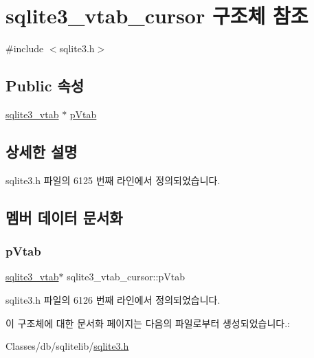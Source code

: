 \hypertarget{structsqlite3__vtab__cursor}{}\section{sqlite3\+\_\+vtab\+\_\+cursor 구조체 참조}
\label{structsqlite3__vtab__cursor}


{\ttfamily \#include $<$sqlite3.\+h$>$}

\subsection*{Public 속성}
\begin{DoxyCompactItemize}
\item 
\hyperlink{structsqlite3__vtab}{sqlite3\+\_\+vtab} $\ast$ \hyperlink{structsqlite3__vtab__cursor_a2989d9f84a35506c3ef9fe9e9ecd3365}{p\+Vtab}
\end{DoxyCompactItemize}


\subsection{상세한 설명}


sqlite3.\+h 파일의 6125 번째 라인에서 정의되었습니다.



\subsection{멤버 데이터 문서화}
\mbox{\label{structsqlite3__vtab__cursor_a2989d9f84a35506c3ef9fe9e9ecd3365}} 
\subsubsection{\texorpdfstring{p\+Vtab}{pVtab}}
{\footnotesize\ttfamily \hyperlink{structsqlite3__vtab}{sqlite3\+\_\+vtab}$\ast$ sqlite3\+\_\+vtab\+\_\+cursor\+::p\+Vtab}



sqlite3.\+h 파일의 6126 번째 라인에서 정의되었습니다.



이 구조체에 대한 문서화 페이지는 다음의 파일로부터 생성되었습니다.\+:\begin{DoxyCompactItemize}
\item 
Classes/db/sqlitelib/\hyperlink{sqlite3_8h}{sqlite3.\+h}\end{DoxyCompactItemize}
